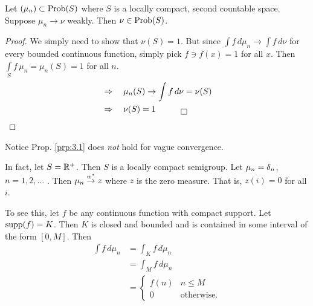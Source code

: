 \begin{proposition}		\label{prp:3.2} 
Let $(\mu_n) \subset \hbox{Prob}(S)$ where $S$ is a locally compact, second countable space.  
Suppose $\mu_n \to \nu$ weakly.  
Then $\nu \in \hbox{Prob}(S)$.
\end{proposition}

\begin{proof} We simply need to show that $\nu(S) = 1$.  
But since $\int f\, d\mu_n \to \int f\, d\nu$ for every bounded continuous function, simply pick $f \ni f(x) = 1$ for all $x$.  
Then $\int\limits_S f\, \mu_n = \mu_n(S) = 1$ for all $n$.
\[
\begin{aligned}
       &\Rightarrow \quad \mu_n(S) \to \int f\, d\nu = \nu (S)          \\
       &\Rightarrow \quad \nu(S) = 1 \quad \qed
\end{aligned}
\]
\end{proof}

\begin{example}	\label{exm:3.4}
Notice Prop. \ref{prp:3.1} does \textsl{not} hold for vague convergence.
\end{example}
 
In fact, let $S = \mathbb{R}^+$.  
Then $S$ is a locally compact semigroup.  
Let $\mu_n = \delta_n$, $n = 1,2,\ldots$ .  
Then $\mu_n \buildrel w^* \over \rightarrow z$ where $z$ is the zero measure.
That is, $z(i) = 0$ for all $i$.

To see this, let $f$ be any continuous function with compact
support.  
Let $\hbox{supp}(f) = K$.  
Then $K$ is closed and bounded and is contained in some interval of the form $[0,M]$.  
Then
\[
\begin{aligned}
       \int f\, d\mu_n &= \int_K f\, d\mu_n        \\
       &= \int_M f\, d\mu_n                        \\
       &= \begin{cases}
          f(n)   &n \le M                          \\
          0      &\text{otherwise.}
          \end{cases}
\end{aligned}
\]

